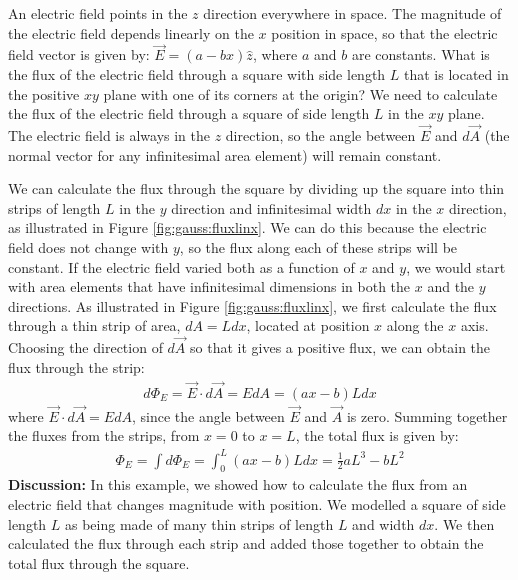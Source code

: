 \begin{example}{An electric field points in the $z$ direction everywhere in space. The magnitude of the electric field depends linearly on the $x$ position in space, so that the electric field vector is given by: $\vec E=(a-bx)\hat z$, where $a$ and $b$ are constants. What is the flux of the electric field through a square with side length $L$ that is located in the positive $xy$ plane with one of its corners at the origin?}
We need to calculate the flux of the electric field through a square of side length $L$ in the $xy$ plane. The electric field is always in the $z$ direction, so the angle between $\vec E$ and $d\vec A$ (the normal vector for any infinitesimal area element) will remain constant.

We can calculate the flux through the square by dividing up the square into thin strips of length $L$ in the $y$ direction and infinitesimal width $dx$ in the $x$ direction, as illustrated in Figure \ref{fig:gauss:fluxlinx}. We can do this because the electric field does not change with $y$, so the flux along each of these strips will be constant. If the electric field varied both as a function of $x$ and $y$, we would start with area elements that have infinitesimal dimensions in both the $x$ and the $y$ directions. 
As illustrated in Figure \ref{fig:gauss:fluxlinx}, we first calculate the flux through a thin strip of area, $dA=Ldx$, located at position $x$ along the $x$ axis. Choosing the direction of $d\vec A$ so that it gives a positive flux, we can obtain the flux through the strip:
\begin{align*}
d\Phi_E=\vec E\cdot d\vec A=EdA=(ax-b)Ldx
\end{align*}
where $\vec E\cdot d\vec A=EdA$, since the angle between $\vec E$ and $\vec A$ is zero. Summing together the fluxes from the strips, from $x=0$ to $x=L$, the total flux is given by:
\begin{align*}
\Phi_E=\int d\Phi_E=\int_0^L(ax-b)Ldx=\frac{1}{2}aL^3-bL^2
\end{align*}
\textbf{Discussion:} In this example, we showed how to calculate the flux from an electric field that changes magnitude with position. We modelled a square of side length $L$ as being made of many thin strips of length $L$ and width $dx$. We then calculated the flux through each strip and added those together to obtain the total flux through the square.
\end{example}
